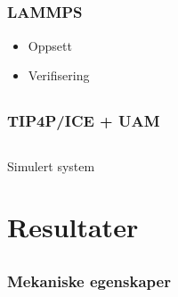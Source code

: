 \documentclass[utf8x, notes]{beamer}
\begin{document}
\subsection{}
\begin{frame}
\frametitle{LAMMPS}
\begin{itemize}
\item Oppsett
\item Verifisering
\end{itemize}
\end{frame}

\subsection{}
\begin{frame}
\frametitle{TIP4P/ICE + UAM}
\end{frame}

\subsection{}
\begin{frame}
Simulert system
\end{frame}

\section{Resultater}

\subsection{}
\begin{frame}
\frametitle{Mekaniske egenskaper}
\end{frame}
\end{document}
